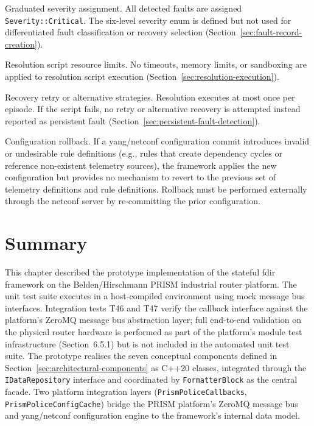 Graduated severity assignment. All detected faults are assigned \texttt{Severity::Critical}. The six-level severity enum is defined but not used for differentiated fault classification or recovery selection (Section~\ref{sec:fault-record-creation}).

Resolution script resource limits. No timeouts, memory limits, or sandboxing are applied to resolution script execution (Section~\ref{sec:resolution-execution}).

Recovery retry or alternative strategies. Resolution executes at most once per episode. If the script fails, no retry or alternative recovery is attempted instead reported as persistent fault (Section~\ref{sec:persistent-fault-detection}).

Configuration rollback. If a \gls{yang}/\gls{netconf} configuration commit introduces invalid or undesirable rule definitions (e.g., rules that create dependency cycles or reference non-existent telemetry sources), the framework applies the new configuration but provides no mechanism to revert to the previous set of telemetry definitions and rule definitions. Rollback must be performed externally through the \gls{netconf} server by re-committing the prior configuration.

\section{Summary}\label{sec:impl-summary}

This chapter described the prototype implementation of the stateful \gls{fdir} framework on the Belden/Hirschmann PRISM industrial router platform. The unit test suite executes in a host-compiled environment using mock message bus interfaces. Integration tests T46 and T47 verify the callback interface against the platform's ZeroMQ message bus abstraction layer; full end-to-end validation on the physical router hardware is performed as part of the platform's module test infrastructure (Section~6.5.1) but is not included in the automated unit test suite. The prototype realises the seven conceptual components defined in Section~\ref{sec:architectural-components} as C++20 classes, integrated through the \texttt{IDataRepository} interface and coordinated by \texttt{FormatterBlock} as the central facade. Two platform integration layers (\texttt{PrismPoliceCallbacks}, \texttt{PrismPoliceConfigCache}) bridge the PRISM platform's ZeroMQ message bus and \gls{yang}/\gls{netconf} configuration engine to the framework's internal data model.

